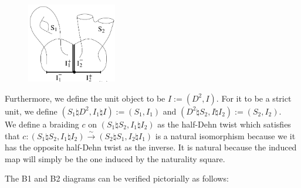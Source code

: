 \documentclass[reqno]{amsart}
\theoremstyle{definition}
\theoremstyle{remark}
\begin{document}
   \begin{figure}[htpb]
       \centering
       \includegraphics[width=0.35\textwidth]{connected-sum.png}
       \label{fig:connected-sum-png}
   \end{figure}

   Furthermore, we define the unit object to be
   $I := \left( D^2, I \right) $. For it to be a strict unit, 
   we define $\left( S_1 \natural D^2, I_1 \natural I \right) 
   := \left( S_1, I_1 \right) $ and
   $\left( D^2 \natural S_2, I \natural I_2 \right) :=
   \left( S_2, I_2 \right) $.\\
   

   We define a braiding $c$ on
   $\left( S_1 \natural S_2, I_1 \natural I_2 \right) $ 
   as the half-Dehn twist which satisfies that
   $c \colon \left( S_1 \natural S_2, I_1 \natural I_2 \right) 
   \stackrel{\sim}{\to } \left( S_2 \natural S_1, I_2 \natural I_1 \right)  $
   is a natural isomorphism because we
   it has the opposite half-Dehn twist as the inverse. It is
   natural because the induced map will simply be the one induced by
   the naturality square.

   The B1 and B2 diagrams can be verified pictorially as follows:
\end{document}
